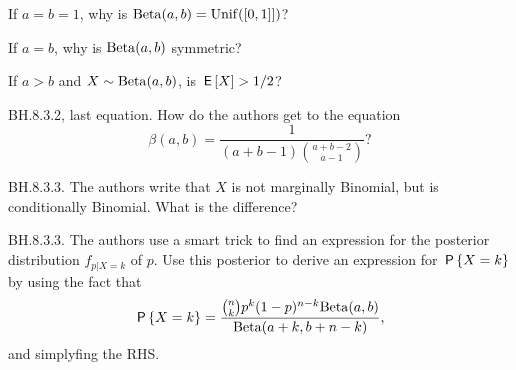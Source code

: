 \begin{exercise}
If $a=b=1$, why is $\Beta{a,b}=\Unif{[0,1]]}$?
\begin{hint}
\end{hint}
\begin{solution}
\end{solution}
\end{exercise}


\begin{exercise}
If $a=b$, why is $\Beta{a,b}$ symmetric?
\begin{hint}
\end{hint}
\begin{solution}
\end{solution}
\end{exercise}

\begin{exercise}
If $a>b$ and  $X\sim\Beta{a,b}$, is $\E X > 1/2$?
\begin{hint}
\end{hint}
\begin{solution}
\end{solution}
\end{exercise}

\begin{exercise}
BH.8.3.2, last equation. How do the authors get to the equation
\begin{equation*}
\beta(a,b) = \frac{1}{(a+b-1) {a+b-2\choose a-1}}?
\end{equation*}
\begin{hint}
\end{hint}
\begin{solution}
\end{solution}
\end{exercise}

\begin{exercise}
BH.8.3.3. The authors write that $X$ is not marginally Binomial, but is conditionally Binomial. What is the difference?
\begin{hint}
\end{hint}
\begin{solution}
\end{solution}
\end{exercise}

\begin{exercise}
BH.8.3.3. The authors use a smart trick to find an expression for the posterior distribution $f_{p|X=k}$ of $p$. Use this posterior to derive an expression for $\P{X=k}$ by using the fact that
\begin{equation*}
\P{X=k} = \frac{{n\choose k} p^{k}(1-p)^{n-k} \Beta{a,b}}{\Beta{a+k, b+n-k}},
\end{equation*}
and simplyfing the RHS.
\begin{hint}
\end{hint}
\begin{solution}
\end{solution}
\end{exercise}

